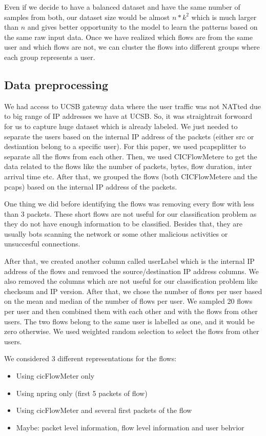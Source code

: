 Even if we decide to have a balanced dataset and have the same number of samples from both, our dataset size would be almost $n*k^2$ which is much larger than $n$ and gives better opportunity to the model to learn the patterns based on the same raw input data. Once we have realized which flows are from the same user and which flows are not, we can cluster the flows into different groups where each group represents a user. 

\subsection{Data preprocessing}
We had access to UCSB gateway data where the user traffic was not NATted due to big range of IP addresses we have at UCSB. So, it was straightrait forwoard for us to capture huge dataset which is already labeled. We just needed to separate the users based on the internal IP address of the packets (either src or destiantion belong to a specific user). For this paper, we used pcapsplitter to separate all the flows from each other. Then, we used CICFlowMetere to get the data related to the flows like the number of packets, bytes, flow duration, inter arrival time etc. After that, we grouped the flows (both CICFlowMetere and the pcaps) based on the internal IP address of the packets.

One thing we did before identifying the flows was removing every flow with less than 3 packets. These short flows are not useful for our classification problem as they do not have enough information to be classified. Besides that, they are usually bots scanning the network or some other malicious activities or unsuccesful connections.

After that, we created another column called userLabel which is the internal IP address of the flows and remvoed the source/destination IP address columns. We also removed the columns which are not useful for our classification problem like checksum and IP version. After that, we chose the number of flows per user based on the mean and median of the number of flows per user. We sampled 20 flows per user and then combined them with each other and with the flows from other users. The two flows belong to the same user is labelled as one, and it would be zero otherwise. We used weighted random selection to select the flows from other users.  

We considered 3 different representations for the flows:
\begin{itemize}
    \item Using cicFlowMeter only
    \item Using npring only (first 5 packets of flow)
    \item Using cicFlowMeter and several first packets of the flow \
    \item Maybe: packet level information, flow level information and user behvior 
\end{itemize}

